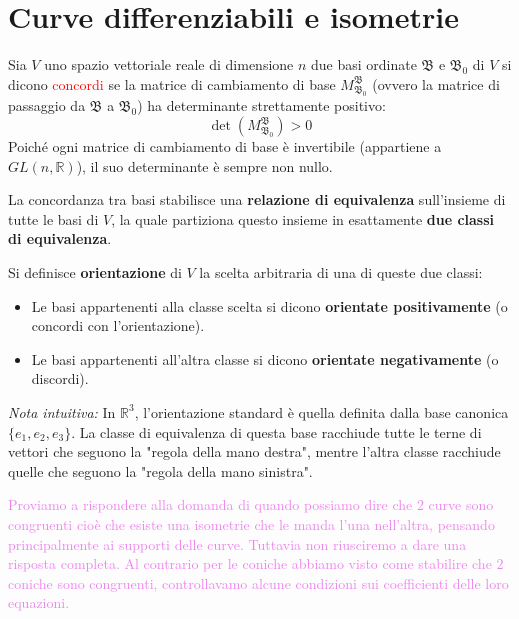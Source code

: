     \section{Curve differenziabili e isometrie}
        \begin{richiamo}
        \mbox{}

        Sia $V$ uno spazio vettoriale reale di dimensione $n$ due basi ordinate $\mathfrak{B}$ e $\mathfrak{B}_0$ di $V$ si dicono \textcolor{red}{concordi} se
        la matrice di cambiamento di base $M_{\mathfrak{B}_0}^{\mathfrak{B}}$ (ovvero la matrice di passaggio da $\mathfrak{B}$ a $\mathfrak{B}_0$) ha determinante strettamente positivo:
        \[
        \det\left(M_{\mathfrak{B}_0}^{\mathfrak{B}}\right) > 0
        \]
        Poiché ogni matrice di cambiamento di base è invertibile (appartiene a $GL(n,\mathbb{R})$), il suo determinante è sempre non nullo. 
        
        La concordanza tra basi stabilisce una \textbf{relazione di equivalenza} sull'insieme di tutte le basi di $V$, la quale partiziona questo insieme in esattamente \textbf{due classi di equivalenza}.

        Si definisce \textbf{orientazione} di $V$ la scelta arbitraria di una di queste due classi:
        \begin{itemize}
            \item Le basi appartenenti alla classe scelta si dicono \textbf{orientate positivamente} (o concordi con l'orientazione).
            \item Le basi appartenenti all'altra classe si dicono \textbf{orientate negativamente} (o discordi).
        \end{itemize}
        \textit{Nota intuitiva:} In $\mathbb{R}^3$, l'orientazione standard è quella definita dalla base canonica $\{e_1, e_2, e_3\}$. La classe di equivalenza di questa base racchiude tutte le terne di vettori che seguono la "regola della mano destra", mentre l'altra classe racchiude quelle che seguono la "regola della mano sinistra".
        \end{richiamo}
        \newpage
        \textcolor{violet}{Proviamo a rispondere alla domanda di quando possiamo dire che $2$ curve sono congruenti cioè che 
        esiste una isometrie che le manda l'una nell'altra, pensando principalmente ai supporti delle curve. Tuttavia non riusciremo a dare una risposta completa.}
        \textcolor{violet}{Al contrario per le coniche abbiamo visto come stabilire che $2$ coniche sono congruenti, controllavamo alcune condizioni sui coefficienti delle loro equazioni.}
